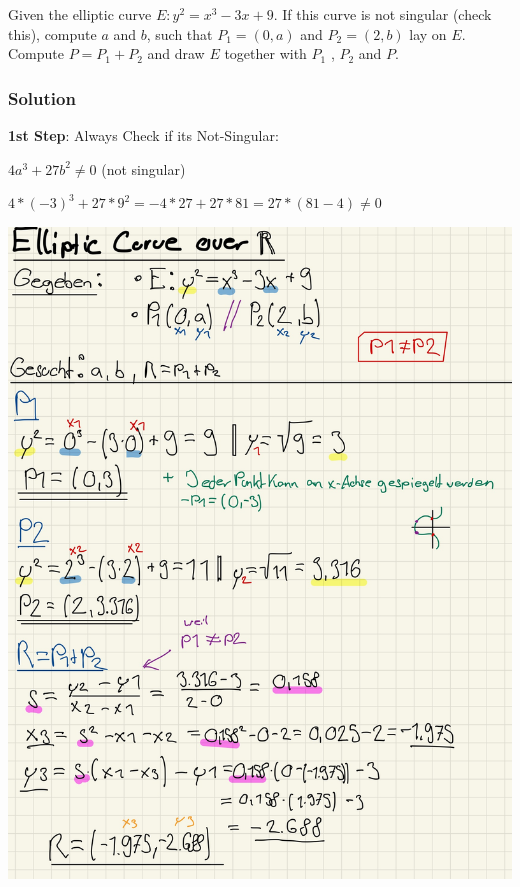 \documentclass[11pt]{article}
\begin{document}
Given the elliptic curve \(E : y^2 = x^3 - 3x + 9\). If this curve is
not singular (check this), compute \(a\) and \(b\), such that
\(P_1 = (0,a)\) and \(P_2 = (2,b)\) lay on \(E\). Compute
\(P = P_1 +P_2\) and draw \(E\) together with \(P_1\) , \(P_2\) and
\(P\).

\hypertarget{solution}{%
\subsubsection{Solution}\label{solution}}

\textbf{1st Step}: Always Check if its Not-Singular:

\(4a^3+27b^2 \neq 0\) (not singular)

\(4*(-3)^3+27*9^2 = -4*27 + 27*81 = 27*(81-4) \neq 0\)

\begin{center}
	\includegraphics[scale=0.8]{img/ecurve1.jpg}
\end{center}


\newpage
\end{document}
